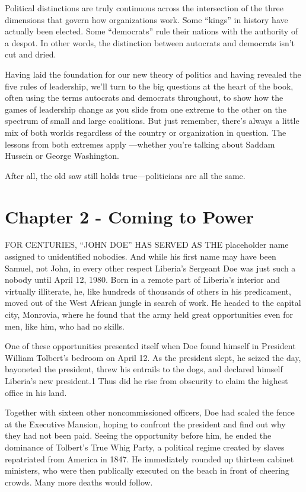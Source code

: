 \documentclass[10pt]{article}
\begin{document}
{\large Political distinctions are truly continuous across the intersection of
the three dimensions that govern how organizations work. Some ``kings'' in
history have actually been elected. Some ``democrats'' rule their nations with
the authority of a despot. In other words, the distinction between autocrats and
democrats isn't cut and dried.}

{\large Having laid the foundation for our new theory of politics and having
revealed the five rules of leadership, we'll turn to the big questions at the
heart of the book, often using the terms autocrats and democrats throughout, to
show how the games of leadership change as you slide from one extreme to the
other on the spectrum of small and large coalitions. But just remember, there's
always a little mix of both worlds regardless of the country or organization in
question. The lessons from both extremes apply ---whether you're talking about
Saddam Hussein or George Washington.}

{\large After all, the old saw still holds true---politicians are all the same.}
\pagebreak{}


\section{Chapter 2 - Coming to Power}

{\large FOR CENTURIES, ``JOHN DOE'' HAS SERVED AS THE placeholder name assigned
to unidentified nobodies. And while his first name may have been Samuel, not
John, in every other respect Liberia's Sergeant Doe was just such a nobody until
April 12, 1980. Born in a remote part of Liberia's interior and virtually
illiterate, he, like hundreds of thousands of others in his predicament, moved
out of the West African jungle in search of work. He headed to the capital city,
Monrovia, where he found that the army held great opportunities even for men,
like him, who had no skills.}

{\large One of these opportunities presented itself when Doe found himself in
President William Tolbert's bedroom on April 12. As the president slept, he
seized the day, bayoneted the president, threw his entrails to the dogs, and
declared himself Liberia's new president.1 Thus did he rise from obscurity to
claim the highest office in his land.}

{\large Together with sixteen other noncommissioned officers, Doe had scaled the
fence at the Executive Mansion, hoping to confront the president and find out why
they had not been paid. Seeing the opportunity before him, he ended the dominance
of Tolbert's True Whig Party, a political regime created by slaves repatriated
from America in 1847. He immediately rounded up thirteen cabinet ministers, who
were then publically executed on the beach in front of cheering crowds. Many more
deaths would follow.}
\end{document}
